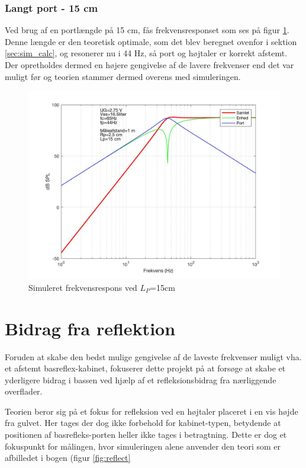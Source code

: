 \subsubsection{Langt port - 15 cm}

Ved brug af en portlængde på 15 cm, fås frekvensresponset som ses på figur \ref{fig:sim_langt}. \\
Denne længde er den teoretisk optimale, som det blev beregnet ovenfor i sektion \ref{sec:sim_calc}, og resonerer nu i 44 Hz, så port og højtaler er korrekt afstemt. 
Der opretholdes dermed en højere gengivelse af de lavere frekvenser end det var muligt før og teorien stammer dermed overens med simuleringen. 

\begin{figure}[h!]
	\centering
	\includegraphics[width=.8\textwidth]{Pics/sim_lang}
	\caption{Simuleret frekvensrespons ved $L_P$=15cm } 
	\label{fig:sim_langt}
\end{figure}


\section{Bidrag fra reflektion}
\label{sec:reflection}
Foruden at skabe den bedst mulige gengivelse af de laveste frekvenser muligt vha. et afstemt basreflex-kabinet, fokuserer dette projekt på at forsøge at skabe et yderligere bidrag i bassen ved hjælp af et refleksionsbidrag fra nærliggende overflader. 

Teorien beror sig på et fokus for refleksion ved en højtaler placeret i en vis højde fra gulvet. Her tages der dog ikke forbehold for kabinet-typen, betydende at positionen af basrefleks-porten heller ikke tages i betragtning. 
Dette er dog et fokuspunkt for målingen, hvor simuleringen alene anvender den teori som er afbilledet i bogen (figur \ref{fig:reflect}
\cite{Elektroakustik}


